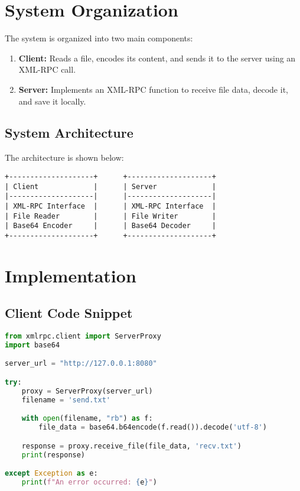 \documentclass[a4paper,12pt]{article}
\begin{document}
\section*{System Organization}
The system is organized into two main components:
\begin{enumerate}
    \item \textbf{Client:} Reads a file, encodes its content, and sends it to the server using an XML-RPC call.
    \item \textbf{Server:} Implements an XML-RPC function to receive file data, decode it, and save it locally.
\end{enumerate}

\subsection*{System Architecture}
The architecture is shown below:
\begin{verbatim}
+--------------------+      +--------------------+
| Client             |      | Server             |
|--------------------|      |--------------------|
| XML-RPC Interface  |      | XML-RPC Interface  |
| File Reader        |      | File Writer        |
| Base64 Encoder     |      | Base64 Decoder     |
+--------------------+      +--------------------+
\end{verbatim}

\section*{Implementation}

\subsection*{Client Code Snippet}
\begin{lstlisting}[language=python]
from xmlrpc.client import ServerProxy
import base64

server_url = "http://127.0.0.1:8080"

try:
    proxy = ServerProxy(server_url)
    filename = 'send.txt'

    with open(filename, "rb") as f:
        file_data = base64.b64encode(f.read()).decode('utf-8')

    response = proxy.receive_file(file_data, 'recv.txt')
    print(response)

except Exception as e:
    print(f"An error occurred: {e}")
\end{lstlisting}
\end{document}
